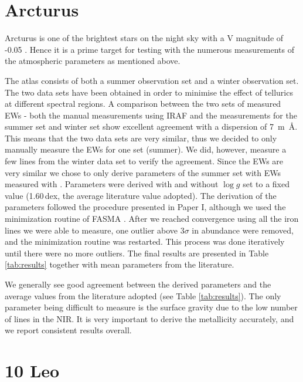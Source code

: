 \section{Arcturus}
\label{sec:arcturus}

Arcturus is one of the brightest stars on the night sky with a V magnitude of -0.05
\citep{Ducati2002}. Hence it is a prime target for testing with the numerous measurements of the
atmospheric parameters as mentioned above.

The atlas consists of both a summer observation set and a winter observation set. The two data sets
have been obtained in order to minimise the effect of tellurics at different spectral regions. A
comparison between the two sets of measured EWs - both the manual measurements using IRAF and the
measurements for the summer set and winter set show excellent agreement with a dispersion of
\SI{7}{m\angstrom}. This means that the two data sets are very similar, thus we decided to only
manually measure the EWs for one set (summer). We did, however, measure a few lines from the winter
data set to verify the agreement. Since the EWs are very similar we chose to only derive parameters
of the summer set with EWs measured with \ARES. Parameters were derived with and without $\log g$
set to a fixed value (1.60\,dex, the average literature value adopted). The derivation of the
parameters followed the procedure presented in Paper I, although we used the minimization routine of
FASMA \citep{Andreasen2017a}. After we reached convergence using all the iron lines we were able to
measure, one outlier above $3\sigma$ in abundance were removed, and the minimization routine was
restarted. This process was done iteratively until there were no more outliers. The final results
are presented in Table \ref{tab:results} together with mean parameters from the literature.

We generally see good agreement between the derived parameters and the average values from the
literature adopted (see Table \ref{tab:results}). The only parameter being difficult to measure is
the surface gravity due to the low number of  lines in the NIR. It is very important to
derive the metallicity accurately, and we report consistent results overall.


\section{10 Leo}
\label{sec:10Leo}

